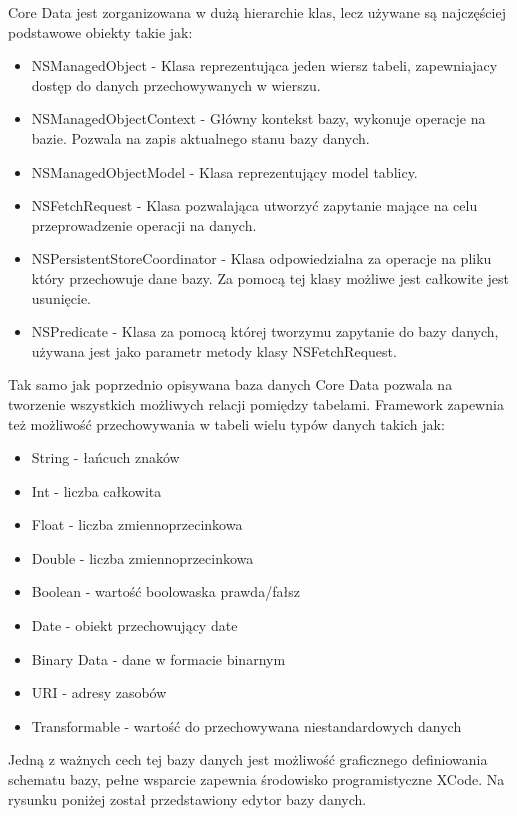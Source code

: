 Core Data jest zorganizowana w dużą hierarchie klas, lecz używane są najczęściej podstawowe obiekty takie jak: 

\begin{itemize}
	\item NSManagedObject - Klasa reprezentująca jeden wiersz tabeli, zapewniajacy dostęp do danych przechowywanych w wierszu.
	\item NSManagedObjectContext - Główny kontekst bazy, wykonuje operacje na bazie. Pozwala na zapis aktualnego stanu bazy danych.
	\item NSManagedObjectModel	- Klasa reprezentujący model tablicy. 
	\item NSFetchRequest - Klasa pozwalająca utworzyć zapytanie mające na celu przeprowadzenie operacji na danych.
	\item NSPersistentStoreCoordinator - Klasa odpowiedzialna za operacje na pliku który przechowuje dane bazy. Za pomocą tej klasy możliwe jest całkowite jest usunięcie. 
	\item NSPredicate - Klasa za pomocą której tworzymu zapytanie do bazy danych, używana jest jako parametr metody klasy NSFetchRequest.
\end{itemize}

Tak samo jak poprzednio opisywana baza danych Core Data pozwala na tworzenie wszystkich możliwych relacji pomiędzy tabelami. Framework zapewnia też możliwość przechowywania w tabeli wielu typów danych takich jak: 

\begin{itemize}
	\item String - łańcuch znaków
	\item Int - liczba całkowita
	\item Float - liczba zmiennoprzecinkowa
	\item Double  - liczba zmiennoprzecinkowa
	\item Boolean - wartość boolowaska prawda/fałsz 
	\item Date - obiekt przechowujący date
	\item Binary Data - dane w formacie binarnym 
	\item URI - adresy zasobów
	\item Transformable - wartość do przechowywana niestandardowych danych 
\end{itemize}

Jedną z ważnych cech tej bazy danych jest możliwość graficznego definiowania schematu bazy, pełne wsparcie zapewnia środowisko programistyczne XCode. Na rysunku  poniżej został przedstawiony edytor bazy danych. \par

